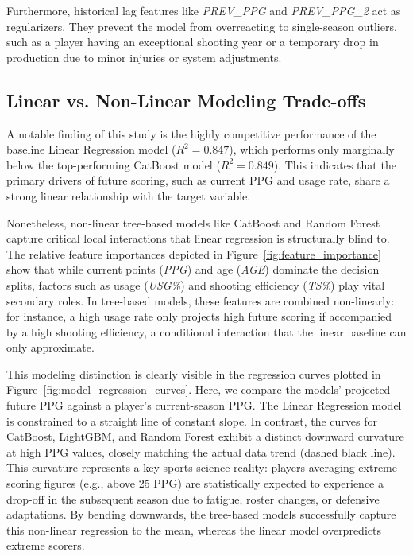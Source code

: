 \documentclass[conference]{IEEEtran}
\begin{document}
Furthermore, historical lag features like \textit{PREV\_PPG} and \textit{PREV\_PPG\_2} act as regularizers. They prevent the model from overreacting to single-season outliers, such as a player having an exceptional shooting year or a temporary drop in production due to minor injuries or system adjustments.

\subsection{Linear vs. Non-Linear Modeling Trade-offs}
A notable finding of this study is the highly competitive performance of the baseline Linear Regression model ($R^2 = 0.847$), which performs only marginally below the top-performing CatBoost model ($R^2 = 0.849$). This indicates that the primary drivers of future scoring, such as current PPG and usage rate, share a strong linear relationship with the target variable. 

Nonetheless, non-linear tree-based models like CatBoost and Random Forest capture critical local interactions that linear regression is structurally blind to. The relative feature importances depicted in Figure~\ref{fig:feature_importance} show that while current points (\textit{PPG}) and age (\textit{AGE}) dominate the decision splits, factors such as usage (\textit{USG\%}) and shooting efficiency (\textit{TS\%}) play vital secondary roles. In tree-based models, these features are combined non-linearly: for instance, a high usage rate only projects high future scoring if accompanied by a high shooting efficiency, a conditional interaction that the linear baseline can only approximate.

This modeling distinction is clearly visible in the regression curves plotted in Figure~\ref{fig:model_regression_curves}. Here, we compare the models' projected future PPG against a player's current-season PPG. The Linear Regression model is constrained to a straight line of constant slope. In contrast, the curves for CatBoost, LightGBM, and Random Forest exhibit a distinct downward curvature at high PPG values, closely matching the actual data trend (dashed black line). This curvature represents a key sports science reality: players averaging extreme scoring figures (e.g., above 25 PPG) are statistically expected to experience a drop-off in the subsequent season due to fatigue, roster changes, or defensive adaptations. By bending downwards, the tree-based models successfully capture this non-linear regression to the mean, whereas the linear model overpredicts extreme scorers.
\end{document}
